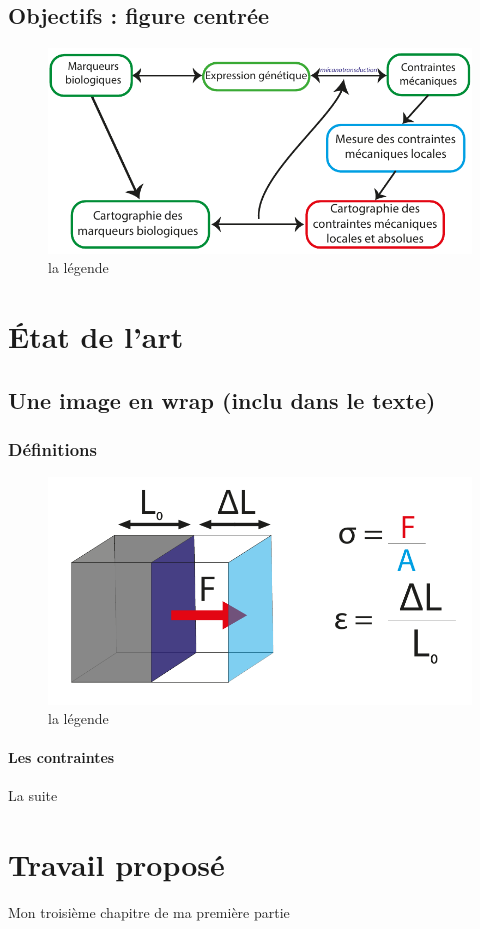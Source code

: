 		\newpage
		\section{Objectifs : figure centrée}

	
\begin{figure}[!h]
			\centering
			\includegraphics[scale=1]{../1-Introduction/introduction_image/schema_final_objectifs.pdf}
			\caption{la légende}
			\label{fig:schema_objectifs}
			\end{figure}	 		




\chapter{État de l'art}
\label{chap:etat_de_lart}
		\section{Une image en wrap (inclu dans le texte)}	
			\subsection{Définitions}
		\begin{figure}
   	 		\includegraphics[scale = 0.6]{../1-Introduction/introduction_image/sigma_def_1.pdf}
    		\caption{la légende}
   			\label{fig:le_nom}
\end{figure}
		
					
				\subsubsection*{Les contraintes}
La suite \\
\chapter{Travail proposé}
Mon troisième chapitre de ma première partie
